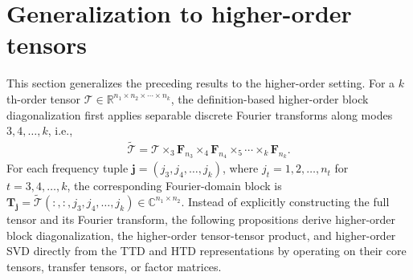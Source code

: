 \documentclass[onefignum,onetabnum]{siamart250211}
\begin{document}

\section{Generalization to higher-order tensors} 
\label{sec:higherorderoperation}
This section generalizes the preceding results to the higher-order setting.  For a $k$th-order tensor
$\mathscr{T}\in\mathbb{R}^{n_1\times n_2\times\cdots\times n_k}$, the
definition-based higher-order block diagonalization first applies separable
discrete Fourier transforms along modes $3,4,\dots,k$, i.e., 
\begin{align*}
\widetilde{\mathscr{T}}
=
\mathscr{T}
\times_3\textbf{F}_{n_3}
\times_4\textbf{F}_{n_4} \times_5
\cdots
\times_k\textbf{F}_{n_k}.
\end{align*}
For each frequency tuple
$\boldsymbol{j}=(j_3,j_4,\dots,j_k)$, where
$j_t=1,2,\dots,n_t$ for $t=3,4,\dots,k$, the corresponding Fourier-domain
block is $\textbf{T}_{\boldsymbol{j}}
=
\widetilde{\mathscr{T}}(:,:,j_3,j_4,\dots,j_k)
\in\mathbb{C}^{n_1\times n_2}.$
Instead of explicitly constructing the full tensor and its Fourier transform, the following propositions derive  higher-order block diagonalization, the higher-order tensor-tensor product, and higher-order SVD directly from the TTD and HTD representations by operating on their core tensors, transfer tensors, or factor matrices.
\end{document}
